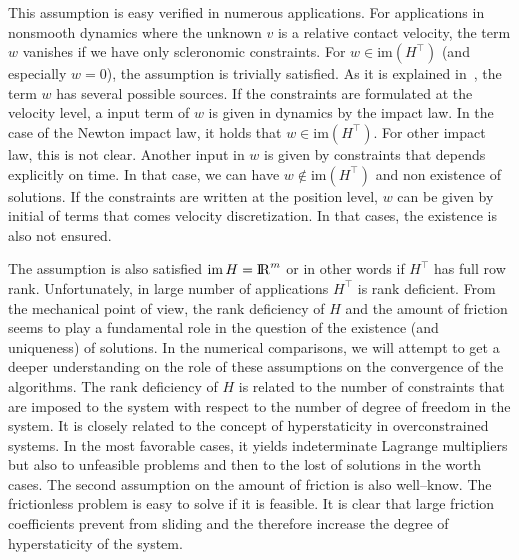 {This assumption is easy verified in numerous applications. For applications in nonsmooth dynamics where the unknown $v$ is a relative contact velocity, the term $w$ vanishes if we have only scleronomic constraints. For $w \in \mathrm{im}(H^\top)$ (and especially $w=0$), the assumption is trivially satisfied. As it is explained in~\cite{Acary.Cadoux2013}, the term $w$ has several possible sources. If the constraints are formulated at the velocity level, a input term of $w$ is given in dynamics by the impact law. In the case of the Newton impact law, it holds that $w \in \mathrm{im}(H^\top)$.   For other impact law, this is not clear. Another input in $w$ is given by constraints that depends explicitly on time. In that case, we can have $w \not\in \mathrm{im}(H^\top)$ and non existence of solutions. If the constraints are written at the position level, $w$ can be given by initial of terms that comes velocity discretization. In that cases, the existence is also not ensured.

The assumption is also satisfied  $\mathrm{im}\, H = \mathrm{I\!R}^m$ or in other words if $H^\top$ has full row rank. Unfortunately, in large number of applications $H^\top$ is rank deficient. 
From the mechanical point of view, the rank deficiency of $H$ and the amount of friction seems to play a fundamental role in the question of the existence (and uniqueness) of solutions. In the numerical comparisons, we will attempt to get a deeper understanding on the role of these assumptions on the convergence of the algorithms. The rank deficiency  of $H$ is related to the number of constraints that are imposed to the system with respect to the number of degree of freedom in the system. It is closely related to the concept of hyperstaticity in overconstrained systems. In the most favorable cases, it yields  indeterminate Lagrange multipliers but also to unfeasible problems and then to the lost of solutions in the worth cases. The second assumption on the amount of friction is also well--know. The frictionless problem is  easy to solve if it is  feasible. It is clear that large friction coefficients prevent from sliding and the therefore increase the degree of hyperstaticity of the system. 






}
